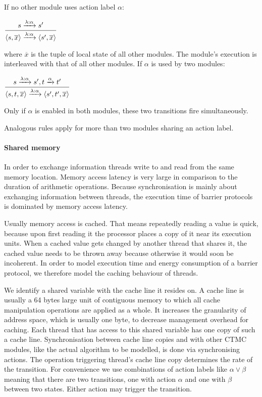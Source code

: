 \documentclass[a4paper, 10pt]{article}
\begin{document}
If no other module uses action label $\alpha$:
\begin{center}
	$\mathlarger{\frac{s \xrightarrow{\lambda : \alpha} s'}{\langle s , \overline{x} \rangle \xrightarrow{\lambda : \alpha} \langle s', \overline{x} \rangle}}$
\end{center}
where $\overline{x}$ is the tuple of local state of all other modules. The module's execution is interleaved with that of all other modules.
If $\alpha$ is used by two modules:
\begin{center}
	$\mathlarger{\frac{s \xrightarrow{\lambda : \alpha} s', t \xrightarrow{\alpha} t'}{\langle s, t , \overline{x} \rangle \xrightarrow{\lambda : \alpha} \langle s', t', \overline{x} \rangle}}$
\end{center}
Only if $\alpha$ is enabled in both modules, these two transitions fire simultaneously.

Analogous rules apply for more than two modules sharing an action label.

\paragraph{Shared memory}
\label{sssec:analysis-modelchecking-modelling-shared-memory}
In order to exchange information threads write to and read from the same memory location.
Memory access latency is very large in comparison to the duration of arithmetic operations.
Because synchronisation is mainly about exchanging information between threads, the execution time of barrier protocols is dominated by memory access latency.

Usually memory access is cached. That means repeatedly reading a value is quick, because upon first reading it the processor places a copy of it near its execution units. When a cached value gets changed by another thread that shares it, the cached value needs to be thrown away because otherwise it would soon be incoherent.
In order to model execution time and energy consumption of a barrier protocol, we therefore model the caching behaviour of threads.

We identify a shared variable with the cache line it resides on. A cache line is usually a 64 bytes large unit of contiguous memory to which all cache manipulation operations are applied as a whole. It increases the granularity of address space, which is usually one byte, to decrease management overhead for caching.
Each thread that has access to this shared variable has one copy of such a cache line.
Synchronisation between cache line copies and with other CTMC modules, like the actual algorithm to be modelled, is done via synchronising actions. The operation triggering thread's cache line copy determines the rate of the transition.
For convenience we use combinations of action labels like $\alpha \lor \beta$ meaning that there are two transitions, one with action $\alpha$ and one with $\beta$ between two states. Either action may trigger the transition.
\end{document}
